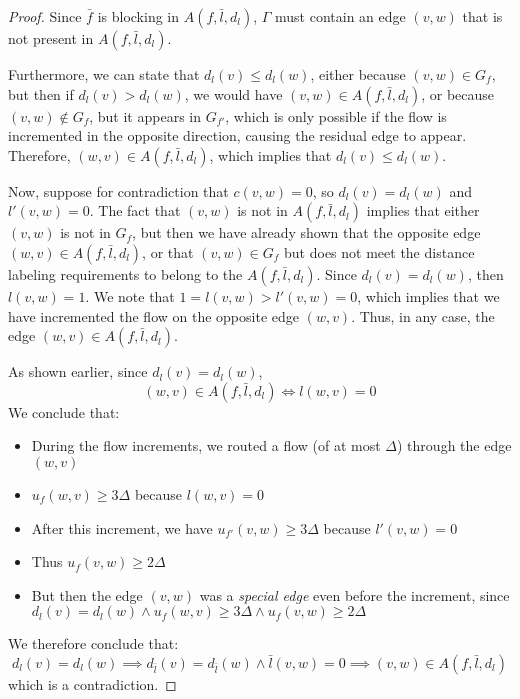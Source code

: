 \begin{proof}
            Since \( \bar{f} \) is blocking in \( A(f,\bar{l}, d_l) \), \( \Gamma \) must contain an edge \( (v,w) \) that is not present in \( A(f,\bar{l}, d_l) \).
            
            Furthermore, we can state that \( d_l(v) \leq d_l(w) \), either because \( (v,w) \in G_f \), but then if \( d_l(v) > d_l(w) \), we would have \( (v,w) \in A(f,\bar{l}, d_l) \),  
            or because \( (v,w) \notin G_f \), but it appears in \( G_{f'} \), which is only possible if the flow is incremented in the opposite direction, causing the residual edge to appear. Therefore, \( (w,v) \in A(f,\bar{l}, d_l) \), which implies that \( d_l(v) \leq d_l(w) \).
            
            Now, suppose for contradiction that \( c(v,w) = 0 \), so \( d_l(v) = d_l(w) \) and \( l'(v,w) = 0 \).  
            The fact that \( (v,w) \) is not in \( A(f,\bar{l}, d_l) \) implies that either \( (v,w) \) is not in \( G_f \), but then we have already shown that the opposite edge \( (w,v) \in A(f,\bar{l}, d_l) \),  
            or that \( (v,w) \in G_f \) but does not meet the distance labeling requirements to belong to the  \( A(f,\bar{l}, d_l) \).  
            Since \( d_l(v) = d_l(w) \), then \( l(v,w) = 1 \). We note that \( 1 = l(v,w) > l'(v,w) = 0 \), which implies that we have incremented the flow on the opposite edge \( (w,v) \).  
            Thus, in any case, the edge \( (w,v) \in A(f,\bar{l}, d_l) \).
            
            As shown earlier, since \( d_l(v) = d_l(w) \),  
            \[
            (w,v) \in A(f,\bar{l}, d_l) \iff l(w,v) = 0
            \]  
            We conclude that:
            \begin{itemize}
                \item During the flow increments, we routed a flow (of at most \( \Delta \)) through the edge \( (w,v) \)
                \item \( u_f(w,v) \geq 3\Delta \) because \( l(w,v) = 0 \)
                \item After this increment, we have \( u_{f'}(v,w) \geq 3\Delta \) because \( l'(v,w) = 0 \)
                \item Thus \( u_f(v,w) \geq 2\Delta \)
                \item But then the edge \( (v,w) \) was a \textit{special edge} even before the increment, since \( d_l(v) = d_l(w) \land u_f(w,v) \geq 3\Delta \land u_f(v,w) \geq 2\Delta \)
            \end{itemize}
            We therefore conclude that:
            \[
            d_l(v) = d_l(w) \implies d_{\bar{l}}(v) = d_{\bar{l}}(w) \land \bar{l}(v,w) = 0 \implies (v,w) \in A(f,\bar{l}, d_l)
            \]
            which is a contradiction.
            
\end{proof}

